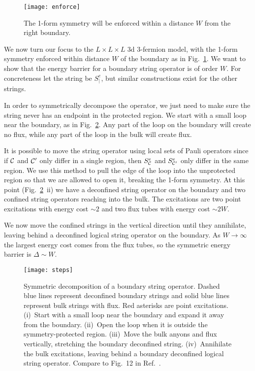 \begin{figure}
\centering
\texttt{[image: enforce]}
\caption[The symmetry-enforced region]{The 1-form symmetry will be enforced within a distance $W$ from the right boundary.}
\label{fig:enforce}
\end{figure}
	
We now turn our focus to the $L\times L\times L$ 3d 3-fermion model, with the 1-form symmetry enforced within distance $W$ of the boundary as in Fig.~\ref{fig:enforce}. We want to show that the energy barrier for a boundary string operator is of order $W$.
For concreteness let the string be $S^e_\vert$, but similar constructions exist for the other strings.

In order to symmetrically decompose the operator, we just need to make sure the string never has an endpoint in the protected region. We start with a small loop near the boundary, as in Fig.~\ref{fig:steps}. Any part of the loop on the boundary will create no flux, while any part of the loop in the bulk will create flux.

It is possible to move the string operator using local sets of Pauli operators since if $\mathcal{C}$ and $\mathcal{C}'$ only differ in a single region, then $S^e_{\mathcal{C}}$ and $S^e_{\mathcal{C}'}$ only differ in the same region. We use this method to pull the edge of the loop into the unprotected region so that we are allowed to open it, breaking the 1-form symmetry. At this point (Fig.~\ref{fig:steps}~ii) we have a deconfined string operator on the boundary and two confined string operators reaching into the bulk. The excitations are two point excitations with energy cost $\sim 2$ and two flux tubes with energy cost $\sim 2W$.

We now move the confined strings in the vertical direction until they annihilate, leaving behind a deconfined logical string operator on the boundary. As $W\to \infty$ the largest energy cost comes from the flux tubes, so the symmetric energy barrier is $\Delta\sim W$.

\begin{figure}
\centering
\texttt{[image: steps]}
\caption[Symmetric decomposition of a boundary string operator]{Symmetric decomposition of a boundary string operator. Dashed blue lines represent deconfined boundary strings and solid blue lines represent bulk strings with flux. Red asterisks are point excitations. (i)~Start with a small loop near the boundary and expand it away from the boundary. (ii)~Open the loop when it is outside the symmetry-protected region. (iii)~Move the bulk anyons and flux vertically, stretching the boundary deconfined string. (iv)~Annihilate the bulk excitations, leaving behind a boundary deconfined logical string operator. Compare to Fig.~12 in Ref.~\cite{RobertsBartlett2020}.}
\label{fig:steps}
\end{figure}
	
